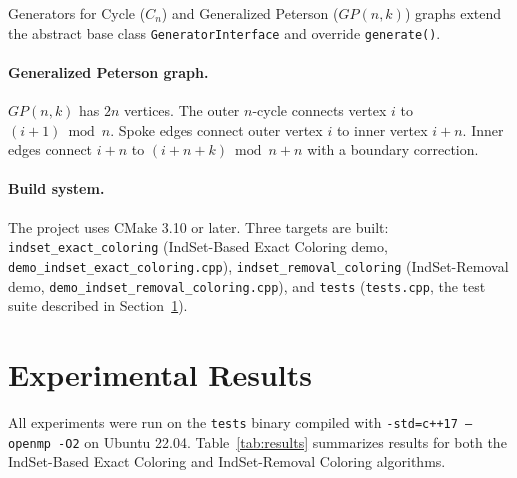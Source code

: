 \documentclass[11pt]{article}
\begin{document}
Generators for Cycle ($C_n$) and Generalized Peterson ($GP(n,k)$) graphs
extend the abstract base class \texttt{GeneratorInterface} and override
\texttt{generate()}.

\paragraph{Generalized Peterson graph.}
$GP(n,k)$ has $2n$ vertices.  The outer $n$-cycle connects vertex $i$ to
$(i+1) \bmod n$.  Spoke edges connect outer vertex $i$ to inner vertex $i+n$.
Inner edges connect $i+n$ to $(i+n+k) \bmod n + n$ with a boundary correction.

\paragraph{Build system.}
\begin{sloppypar}
The project uses CMake 3.10 or later.  Three targets are built:
\texttt{indset\_exact\_coloring} (IndSet-Based Exact Coloring demo,
\texttt{demo\_indset\_exact\_coloring.cpp}),
\texttt{indset\_removal\_coloring} (IndSet-Removal demo,
\texttt{demo\_indset\_removal\_coloring.cpp}), and \texttt{tests}
(\texttt{tests.cpp}, the test suite described in
Section~\ref{sec:experiments}).
\end{sloppypar}

\section{Experimental Results}\label{sec:experiments}

All experiments were run on the \texttt{tests} binary compiled with
\texttt{-std=c++17 --openmp -O2} on Ubuntu 22.04.  Table~\ref{tab:results}
summarizes results for both the IndSet-Based Exact Coloring and IndSet-Removal Coloring algorithms.
\end{document}
